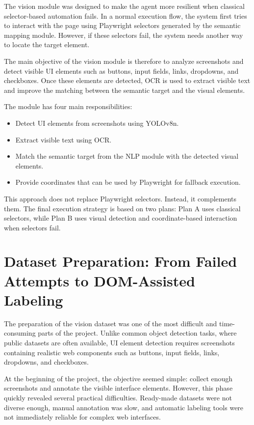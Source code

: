 The vision module was designed to make the agent more resilient when classical selector-based automation fails. In a normal execution flow, the system first tries to interact with the page using Playwright selectors generated by the semantic mapping module. However, if these selectors fail, the system needs another way to locate the target element.

The main objective of the vision module is therefore to analyze screenshots and detect visible UI elements such as buttons, input fields, links, dropdowns, and checkboxes. Once these elements are detected, OCR is used to extract visible text and improve the matching between the semantic target and the visual elements.

The module has four main responsibilities:

\begin{itemize}
	\item Detect UI elements from screenshots using YOLOv8n.
	\item Extract visible text using OCR.
	\item Match the semantic target from the NLP module with the detected visual elements.
	\item Provide coordinates that can be used by Playwright for fallback execution.
\end{itemize}

This approach does not replace Playwright selectors. Instead, it complements them. The final execution strategy is based on two plans: Plan A uses classical selectors, while Plan B uses visual detection and coordinate-based interaction when selectors fail.

\section{Dataset Preparation: From Failed Attempts to DOM-Assisted Labeling}
\label{sec:dataset_preparation}

The preparation of the vision dataset was one of the most difficult and time-consuming parts of the project. Unlike common object detection tasks, where public datasets are often available, UI element detection requires screenshots containing realistic web components such as buttons, input fields, links, dropdowns, and checkboxes.

At the beginning of the project, the objective seemed simple: collect enough screenshots and annotate the visible interface elements. However, this phase quickly revealed several practical difficulties. Ready-made datasets were not diverse enough, manual annotation was slow, and automatic labeling tools were not immediately reliable for complex web interfaces.

